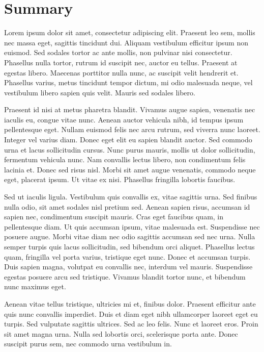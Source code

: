 \chapter*{Summary}

Lorem ipsum dolor sit amet, consectetur adipiscing elit. Praesent leo sem, mollis nec massa eget, sagittis tincidunt dui. Aliquam vestibulum efficitur ipsum non euismod. Sed sodales tortor ac ante mollis, non pulvinar nisi consectetur. Phasellus nulla tortor, rutrum id suscipit nec, auctor eu tellus. Praesent at egestas libero. Maecenas porttitor nulla nunc, ac suscipit velit hendrerit et. Phasellus varius, metus tincidunt tempor dictum, mi odio malesuada neque, vel vestibulum libero sapien quis velit. Mauris sed sodales libero.

Praesent id nisi at metus pharetra blandit. Vivamus augue sapien, venenatis nec iaculis eu, congue vitae nunc. Aenean auctor vehicula nibh, id tempus ipsum pellentesque eget. Nullam euismod felis nec arcu rutrum, sed viverra nunc laoreet. Integer vel varius diam. Donec eget elit eu sapien blandit auctor. Sed commodo urna et lacus sollicitudin cursus. Nunc purus mauris, mollis ut dolor sollicitudin, fermentum vehicula nunc. Nam convallis lectus libero, non condimentum felis lacinia et. Donec sed risus nisl. Morbi sit amet augue venenatis, commodo neque eget, placerat ipsum. Ut vitae ex nisi. Phasellus fringilla lobortis faucibus.

Sed ut iaculis ligula. Vestibulum quis convallis ex, vitae sagittis urna. Sed finibus nulla odio, sit amet sodales nisl pretium sed. Aenean sapien risus, accumsan id sapien nec, condimentum suscipit mauris. Cras eget faucibus quam, in pellentesque diam. Ut quis accumsan ipsum, vitae malesuada est. Suspendisse nec posuere augue. Morbi vitae diam nec odio sagittis accumsan sed nec urna. Nulla semper turpis quis lacus sollicitudin, sed bibendum orci aliquet. Phasellus lectus quam, fringilla vel porta varius, tristique eget nunc. Donec et accumsan turpis. Duis sapien magna, volutpat eu convallis nec, interdum vel mauris. Suspendisse egestas posuere arcu sed tristique. Vivamus blandit tortor nunc, et bibendum nunc maximus eget.

Aenean vitae tellus tristique, ultricies mi et, finibus dolor. Praesent efficitur ante quis nunc convallis imperdiet. Duis et diam eget nibh ullamcorper laoreet eget eu turpis. Sed vulputate sagittis ultrices. Sed ac leo felis. Nunc et laoreet eros. Proin sit amet magna urna. Nulla sed lobortis orci, scelerisque porta ante. Donec suscipit purus sem, nec commodo urna vestibulum in.

